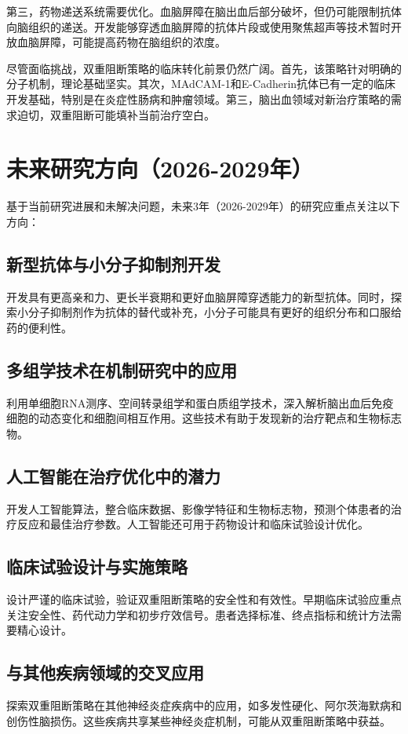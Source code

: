 \documentclass[12pt,a4paper]{article}
\begin{document}
第三，药物递送系统需要优化。血脑屏障在脑出血后部分破坏，但仍可能限制抗体向脑组织的递送。开发能够穿透血脑屏障的抗体片段或使用聚焦超声等技术暂时开放血脑屏障，可能提高药物在脑组织的浓度。

尽管面临挑战，双重阻断策略的临床转化前景仍然广阔。首先，该策略针对明确的分子机制，理论基础坚实。其次，MAdCAM-1和E-Cadherin抗体已有一定的临床开发基础，特别是在炎症性肠病和肿瘤领域。第三，脑出血领域对新治疗策略的需求迫切，双重阻断可能填补当前治疗空白。

\section{未来研究方向（2026-2029年）}
基于当前研究进展和未解决问题，未来3年（2026-2029年）的研究应重点关注以下方向：

\subsection{新型抗体与小分子抑制剂开发}
开发具有更高亲和力、更长半衰期和更好血脑屏障穿透能力的新型抗体。同时，探索小分子抑制剂作为抗体的替代或补充，小分子可能具有更好的组织分布和口服给药的便利性。

\subsection{多组学技术在机制研究中的应用}
利用单细胞RNA测序、空间转录组学和蛋白质组学技术，深入解析脑出血后免疫细胞的动态变化和细胞间相互作用。这些技术有助于发现新的治疗靶点和生物标志物。

\subsection{人工智能在治疗优化中的潜力}
开发人工智能算法，整合临床数据、影像学特征和生物标志物，预测个体患者的治疗反应和最佳治疗参数。人工智能还可用于药物设计和临床试验设计优化。

\subsection{临床试验设计与实施策略}
设计严谨的临床试验，验证双重阻断策略的安全性和有效性。早期临床试验应重点关注安全性、药代动力学和初步疗效信号。患者选择标准、终点指标和统计方法需要精心设计。

\subsection{与其他疾病领域的交叉应用}
探索双重阻断策略在其他神经炎症疾病中的应用，如多发性硬化、阿尔茨海默病和创伤性脑损伤。这些疾病共享某些神经炎症机制，可能从双重阻断策略中获益。
\end{document}
